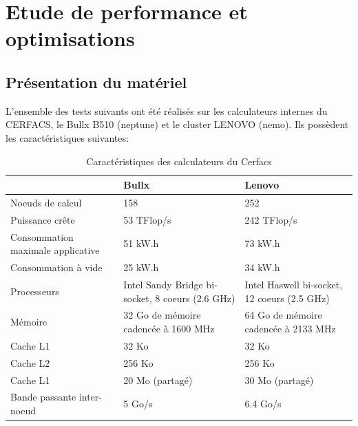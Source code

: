 \section{Etude de performance et optimisations}\label{sec:part3}
\subsection{Présentation du matériel}\label{sec:matos}
L'ensemble des tests suivants ont été réalisés sur les calculateurs internes du CERFACS, le Bullx B510 (neptune) et le cluster LENOVO (nemo). Ils possèdent les caractéristiques suivantes:

\begin{table}[!ht]
  \begin{center}
    \begin{tabular}{|M{3.5cm}|M{5cm}|M{5cm}|}
      \hline
      & Bullx & Lenovo \\
      \hline
      Noeuds de calcul & 158 & 252 \\
      \hline
      Puissance crête & 53 TFlop/s & 242 TFlop/s \\
      \hline
      Consommation maximale applicative & 51 kW.h & 73 kW.h \\
      \hline
      Consommation à vide & 25 kW.h & 34 kW.h \\
      \hline
      Processeurs & Intel Sandy Bridge bi-socket, 8 coeurs (2.6 GHz) & Intel Haswell bi-socket, 12 coeurs (2.5 GHz) \\
      \hline
      Mémoire & 32 Go de mémoire cadencée à 1600 MHz & 64 Go de mémoire cadencée à 2133 MHz \\
      \hline
      Cache L1 & 32 Ko & 32 Ko \\
      \hline
      Cache L2 & 256 Ko & 256 Ko \\
      \hline
      Cache L1 & 20 Mo (partagé) & 30 Mo (partagé) \\
      \hline
      Bande passante inter-noeud & 5 Go/s & 6.4 Go/s \\
      \hline
    \end{tabular}
  \end{center}
  \caption{\label{tab:carac}Caractéristiques des calculateurs du Cerfacs}
\end{table}

